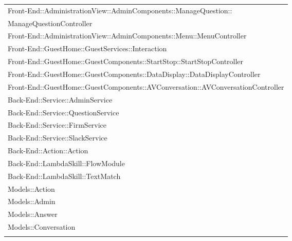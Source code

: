 \documentclass[../DefinizioneDiProdotto.tex]{subfiles}
\begin{document}
\begin{longtable}[c] { >{\centering\arraybackslash}p{13cm} }
				Front-End::AdministrationView::AdminComponents::ManageQuestion::\\ManageQuestionController \\
				\addlinespace[0.3em]
				\midrule
				\addlinespace[0.3em]
				Front-End::AdministrationView::AdminComponents::Menu::MenuController \\
				\addlinespace[0.3em]
				\midrule
				\addlinespace[0.3em]
				Front-End::GuestHome::GuestServices::Interaction \\
				\addlinespace[0.3em]
				\midrule
				\addlinespace[0.3em]
				Front-End::GuestHome::GuestComponents::StartStop::StartStopController \\
				\addlinespace[0.3em]
				\midrule
				\addlinespace[0.3em]
				Front-End::GuestHome::GuestComponents::DataDisplay::DataDisplayController \\
				\addlinespace[0.3em]
				\midrule
				\addlinespace[0.3em]
				Front-End::GuestHome::GuestComponents::AVConversation::AVConversationController \\
				\addlinespace[0.3em]
				\midrule
				\addlinespace[0.3em]
				Back-End::Service::AdminService  \\
		 		\addlinespace[0.3em]
				\midrule
				\addlinespace[0.3em]
				Back-End::Service::QuestionService \\
				\addlinespace[0.3em]
				\midrule
				\addlinespace[0.3em]
				Back-End::Service::FirmService \\
				\addlinespace[0.3em]
				\midrule
				\addlinespace[0.3em]
				Back-End::Service::SlackService \\
				\addlinespace[0.3em]
				\midrule
				\addlinespace[0.3em]
				Back-End::Action::Action \\
				\addlinespace[0.3em]
				\midrule
				\addlinespace[0.3em]
				Back-End::LambdaSkill::FlowModule \\
				\addlinespace[0.3em]
				\midrule
				\addlinespace[0.3em]
				Back-End::LambdaSkill::TextMatch \\
				\addlinespace[0.3em]
				\midrule
				\addlinespace[0.3em]
				Models::Action \\
				\addlinespace[0.3em]
				\midrule
				\addlinespace[0.3em]
				Models::Admin \\
				\addlinespace[0.3em]
				\midrule
				\addlinespace[0.3em]
				Models::Answer \\
				\addlinespace[0.3em]
				\midrule
				\addlinespace[0.3em]
				Models::Conversation \\
				\addlinespace[0.3em]
				\midrule

\end{longtable}
\end{document}

